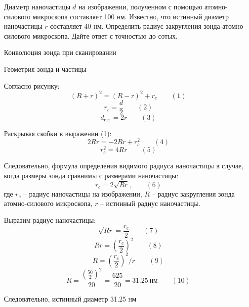 
Диаметр наночастицы $d$ на изображении, полученном с помощью атомно-силового микроскопа составляет 100 нм. Известно, что истинный диаметр наночастицы $r$ составляет 40 нм. Определить радиус закругления зонда атомно-силового микроскопа. Дайте ответ с точностью до сотых.


\begin{center}
    Конволюция зонда при сканировании
\end{center}

\explanationSection


\begin{center}
    Геометрия зонда и частицы
\end{center}

Согласно рисунку:
$$(R+r)^2=(R-r)^2+r_c \qquad (1)$$
$$r_c=\frac{d}{2} \qquad (2)$$
$$d_\text{ист}=2r \qquad (3)$$

Раскрывая скобки в выражении (1):
$$2Rr=-2Rr+r_c^2 \qquad (4)$$
$$r_c^2=4Rr \qquad (5)$$

Следовательно, формула определения видимого радиуса наночастицы в случае, когда размеры зонда сравнимы с размерами наночастицы: 
$$r_c=2 \sqrt{Rr}, \qquad (6) $$
где $r_c$ – радиус наночастицы на изображении, $R$ – радиус закругления зонда атомно-силового микроскопа, $r$ – истинный радиус наночастицы.

Выразим радиус наночастицы:
$$\sqrt{Rr}=\frac{r_c}{2} \qquad (7)$$
$$Rr=\left(\frac{r_c}{2}\right)^2 \qquad (8)$$
$$R=\left(\frac{r_c}{2}\right)^2/r \qquad (9)$$
$$R=\frac{\left(\frac{50}{2}\right)^2}{20}=\frac{625}{20}=31.25 \: \text{нм} \qquad (10)$$

Следовательно, истинный диаметр 31.25 нм

